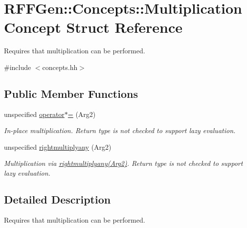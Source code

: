 \hypertarget{structRFFGen_1_1Concepts_1_1MultiplicationConcept}{\section{R\-F\-F\-Gen\-:\-:Concepts\-:\-:Multiplication\-Concept Struct Reference}
\label{structRFFGen_1_1Concepts_1_1MultiplicationConcept}
}


Requires that multiplication can be performed.  




{\ttfamily \#include $<$concepts.\-hh$>$}

\subsection*{Public Member Functions}
\begin{DoxyCompactItemize}
\item 
\hypertarget{structRFFGen_1_1Concepts_1_1MultiplicationConcept_a65cf060bcfd7bd39b527de6c87056539}{unspecified \hyperlink{structRFFGen_1_1Concepts_1_1MultiplicationConcept_a65cf060bcfd7bd39b527de6c87056539}{operator$\ast$=} (Arg2)}\label{structRFFGen_1_1Concepts_1_1MultiplicationConcept_a65cf060bcfd7bd39b527de6c87056539}

\begin{DoxyCompactList}\small\item\em In-\/place multiplication. Return type is not checked to support lazy evaluation. \end{DoxyCompactList}\item 
\hypertarget{structRFFGen_1_1Concepts_1_1MultiplicationConcept_ae876451286ab0e902a5cec841ad01f2e}{unspecified \hyperlink{structRFFGen_1_1Concepts_1_1MultiplicationConcept_ae876451286ab0e902a5cec841ad01f2e}{rightmultiplyany} (Arg2)}\label{structRFFGen_1_1Concepts_1_1MultiplicationConcept_ae876451286ab0e902a5cec841ad01f2e}

\begin{DoxyCompactList}\small\item\em Multiplication via \hyperlink{structRFFGen_1_1Concepts_1_1MultiplicationConcept_ae876451286ab0e902a5cec841ad01f2e}{rightmultiplyany(\-Arg2)}. Return type is not checked to support lazy evaluation. \end{DoxyCompactList}\end{DoxyCompactItemize}


\subsection{Detailed Description}
Requires that multiplication can be performed. 

